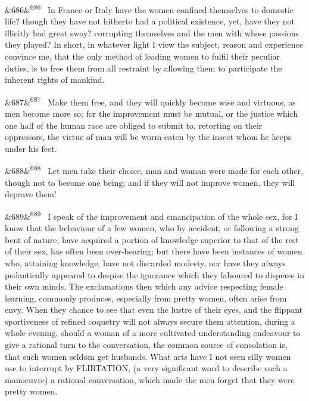 \documentclass[12pt]{article}
\newcommand{\para}[1][]{\par\noindent\ifx&#1&\else\textsuperscript{\footnotesize #1}~\fi}
\begin{document}
\para[686] In France or Italy have the women confined themselves to domestic life? though they have not hitherto had a political existence, yet, have they not illicitly had great sway? corrupting themselves and the men with whose passions they played? In short, in whatever light I view the subject, reason and experience convince me, that the only method of leading women to fulfil their peculiar duties, is to free them from all restraint by allowing them to participate the inherent rights of mankind.

\para[687] Make them free, and they will quickly become wise and virtuous, as men become more so; for the improvement must be mutual, or the justice which one half of the human race are obliged to submit to, retorting on their oppressors, the virtue of man will be worm-eaten by the insect whom he keeps under his feet.

\para[688] Let men take their choice, man and woman were made for each other, though not to become one being; and if they will not improve women, they will deprave them!

\para[689] I speak of the improvement and emancipation of the whole sex, for I know that the behaviour of a few women, who by accident, or following a strong bent of nature, have acquired a portion of knowledge superior to that of the rest of their sex, has often been over-bearing; but there have been instances of women who, attaining knowledge, have not discarded modesty, nor have they always pedantically appeared to despise the ignorance which they laboured to disperse in their own minds. The exclamations then which any advice respecting female learning, commonly produces, especially from pretty women, often arise from envy. When they chance to see that even the lustre of their eyes, and the flippant sportiveness of refined coquetry will not always secure them attention, during a whole evening, should a woman of a more cultivated understanding endeavour to give a rational turn to the conversation, the common source of consolation is, that such women seldom get husbands. What arts have I not seen silly women use to interrupt by FLIRTATION, (a very significant word to describe such a manoeuvre) a rational conversation, which made the men forget that they were pretty women.
\end{document}
